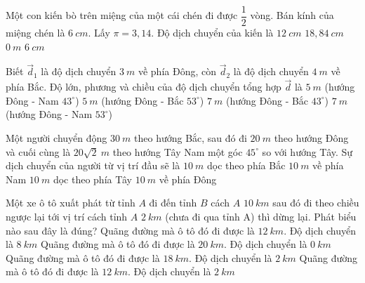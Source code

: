 \begin{vidu}
Một con kiến bò trên miệng của một cái chén đi được $\dfrac{1}{2}$ vòng. Bán kính của miệng chén là $6\ cm$. Lấy $\pi=3,14$. Độ dịch chuyển của kiến là
\choice
{\True $12\ cm$}
{$18,84\ cm$}
{$0\ m$}
{$6\ cm$}
\loigiai{
}
\end{vidu}
\begin{vidu}%
Biết $\vec d_1$ là độ dịch chuyển $3\ m$ về phía Đông, còn $\vec d_2$ là độ dịch chuyển $4\ m$ về phía Bắc. Độ lớn, phương và chiều của độ dịch chuyển tổng hợp $\vec d$ là
\choice
{$5\ m$ (hướng Đông - Nam $43^\circ$)}
{\True $5\ m$ (hướng Đông - Bắc $53^\circ$)}
{$7\ m$ (hướng Đông - Bắc $43^\circ$)}
{$7\ m$ (hướng Đông - Nam $53^\circ$)}
\end{vidu}

\begin{vidu}
Một người chuyển động $30\ m$ theo hướng Bắc, sau đó đi $20\ m$ theo hướng Đông và cuối cùng là $20 \sqrt{2}\ m$ theo hướng Tây Nam một góc $45^\circ$ so với hướng Tây. Sự dịch chuyển của người từ vị trí đầu sẽ là
\choice
{\True $10\ m$ dọc theo phía Bắc}
{$10\ m$ về phía Nam}
{$10\ m$ dọc theo phía Tây}
{$10\ m$ về phía Đông}
\loigiai{
}
\end{vidu}
\begin{vidu}
Một xe ô tô xuất phát từ tỉnh $A$ đi đến tỉnh $B$ cách $A$ $10\ km$ sau đó đi theo chiều ngược lại tới vị trí cách tỉnh $A$ $2\ km$ (chưa đi qua tỉnh A) thì dừng lại. Phát biểu nào sau đây là đúng?
\choice
{Quãng đường mà ô tô đó đi được là $12\ km$. Độ dịch chuyển là $8\ km$}
{Quãng đường mà ô tô đó đi được là $20\ km$. Độ dịch chuyển là $0\ km$}
{\True Quãng đường mà ô tô đó đi được là $18\ km$. Độ dịch chuyển là $2\ km$}
{Quãng đường mà ô tô đó đi được là $12\ km$. Độ dịch chuyển là $2\ km$}
\loigiai{
}
\end{vidu}


